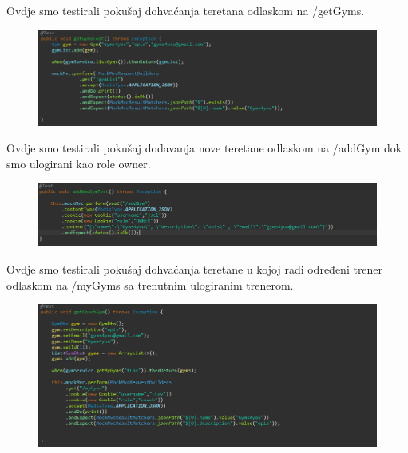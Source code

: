 			 \noindent {}
			 
             Ovdje smo testirali pokušaj dohvaćanja teretana odlaskom na /getGyms.

			\begin{figure}[H]
    			\hspace*{-1.5cm}
    			\includegraphics[scale=0.5]{slike/getGyms.PNG} %
    			\centering
    			\label{fig:promjene}
    	    \end{figure}
	

			\noindent {}
			
            Ovdje smo testirali pokušaj dodavanja nove teretane odlaskom na /addGym  dok smo ulogirani kao role owner.

			\begin{figure}[H]
    			\hspace*{-1.5cm}
    			\includegraphics[scale=0.5]{slike/addNewGym.PNG} %
    			\centering
    			\label{fig:promjene}
    	    \end{figure}
	

			\noindent {}
			
			Ovdje smo testirali pokušaj dohvaćanja teretane u kojoj radi određeni trener odlaskom na /myGyms sa trenutnim ulogiranim trenerom.

			\begin{figure}[H]
    			\hspace*{-1.5cm}
    			\includegraphics[scale=0.5]{slike/getCoachGym.PNG} %
    			\centering
    			\label{fig:promjene}
    	    \end{figure}
	

